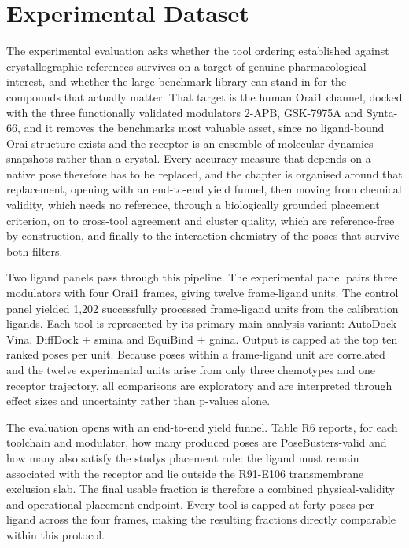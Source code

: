 \protect\hypertarget{_Toc235735934}{}{}

\hypertarget{experimental-dataset-1}{%
\section{Experimental Dataset}\label{experimental-dataset-1}}

The experimental evaluation asks whether the tool ordering established against crystallographic references survives on a target of genuine pharmacological interest, and whether the large benchmark library can stand in for the compounds that actually matter. That target is the human Orai1 channel, docked with the three functionally validated modulators 2-APB, GSK-7975A and Synta-66, and it removes the benchmark\textquotesingle s most valuable asset, since no ligand-bound Orai structure exists and the receptor is an ensemble of molecular-dynamics snapshots rather than a crystal. Every accuracy measure that depends on a native pose therefore has to be replaced, and the chapter is organised around that replacement, opening with an end-to-end yield funnel, then moving from chemical validity, which needs no reference, through a biologically grounded placement criterion, on to cross-tool agreement and cluster quality, which are reference-free by construction, and finally to the interaction chemistry of the poses that survive both filters.

Two ligand panels pass through this pipeline. The experimental panel pairs three modulators with four Orai1 frames, giving twelve frame-ligand units. The control panel yielded 1,202 successfully processed frame-ligand units from the calibration ligands. Each tool is represented by its primary main-analysis variant: AutoDock Vina, DiffDock + smina and EquiBind + gnina. Output is capped at the top ten ranked poses per unit. Because poses within a frame-ligand unit are correlated and the twelve experimental units arise from only three chemotypes and one receptor trajectory, all comparisons are exploratory and are interpreted through effect sizes and uncertainty rather than p-values alone.

The evaluation opens with an end-to-end yield funnel. Table R6 reports, for each toolchain and modulator, how many produced poses are PoseBusters-valid and how many also satisfy the study\textquotesingle s placement rule: the ligand must remain associated with the receptor and lie outside the R91-E106 transmembrane exclusion slab. The final usable fraction is therefore a combined physical-validity and operational-placement endpoint. Every tool is capped at forty poses per ligand across the four frames, making the resulting fractions directly comparable within this protocol.

